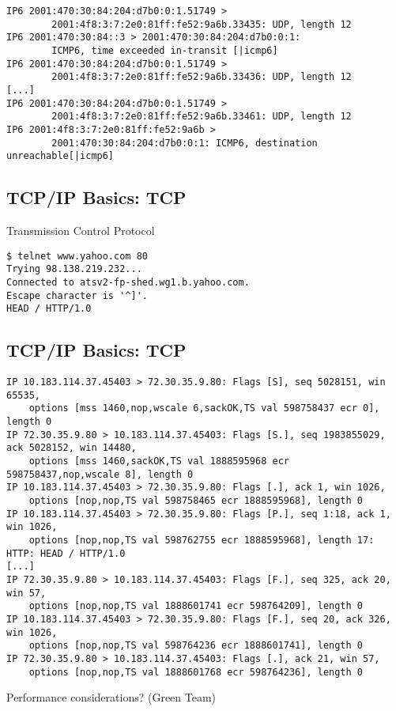 \documentclass[xga]{xdvislides}
\begin{document}
\begin{verbatim}
IP6 2001:470:30:84:204:d7b0:0:1.51749 >
        2001:4f8:3:7:2e0:81ff:fe52:9a6b.33435: UDP, length 12
IP6 2001:470:30:84::3 > 2001:470:30:84:204:d7b0:0:1:
        ICMP6, time exceeded in-transit [|icmp6]
IP6 2001:470:30:84:204:d7b0:0:1.51749 >
        2001:4f8:3:7:2e0:81ff:fe52:9a6b.33436: UDP, length 12
[...]
IP6 2001:470:30:84:204:d7b0:0:1.51749 >
        2001:4f8:3:7:2e0:81ff:fe52:9a6b.33461: UDP, length 12
IP6 2001:4f8:3:7:2e0:81ff:fe52:9a6b >
        2001:470:30:84:204:d7b0:0:1: ICMP6, destination unreachable[|icmp6]
\end{verbatim}

\subsection{TCP/IP Basics: TCP}
\begin{center}
Transmission Control Protocol
\end{center}
\vspace{.2in}
\begin{verbatim}
$ telnet www.yahoo.com 80
Trying 98.138.219.232...
Connected to atsv2-fp-shed.wg1.b.yahoo.com.
Escape character is '^]'.
HEAD / HTTP/1.0
\end{verbatim}

\subsection{TCP/IP Basics: TCP}
\begin{verbatim}
IP 10.183.114.37.45403 > 72.30.35.9.80: Flags [S], seq 5028151, win 65535,
	options [mss 1460,nop,wscale 6,sackOK,TS val 598758437 ecr 0], length 0
IP 72.30.35.9.80 > 10.183.114.37.45403: Flags [S.], seq 1983855029, ack 5028152, win 14480,
	options [mss 1460,sackOK,TS val 1888595968 ecr 598758437,nop,wscale 8], length 0
IP 10.183.114.37.45403 > 72.30.35.9.80: Flags [.], ack 1, win 1026,
	options [nop,nop,TS val 598758465 ecr 1888595968], length 0
IP 10.183.114.37.45403 > 72.30.35.9.80: Flags [P.], seq 1:18, ack 1, win 1026,
	options [nop,nop,TS val 598762755 ecr 1888595968], length 17: HTTP: HEAD / HTTP/1.0
[...]
IP 72.30.35.9.80 > 10.183.114.37.45403: Flags [F.], seq 325, ack 20, win 57,
	options [nop,nop,TS val 1888601741 ecr 598764209], length 0
IP 10.183.114.37.45403 > 72.30.35.9.80: Flags [F.], seq 20, ack 326, win 1026,
	options [nop,nop,TS val 598764236 ecr 1888601741], length 0
IP 72.30.35.9.80 > 10.183.114.37.45403: Flags [.], ack 21, win 57,
	options [nop,nop,TS val 1888601768 ecr 598764236], length 0
\end{verbatim}
Performance considerations? (Green Team)
\end{document}
